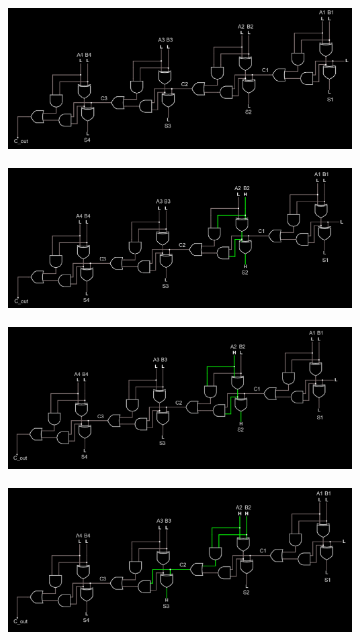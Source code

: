\documentclass{article}
\begin{document}
	\begin{figure}[H]
		\centering
		\begin{subfigure}[t]{0.8\textwidth}
			\centering
			\includegraphics[width=\textwidth]{4bit/4bit_000.png}
		\end{subfigure}
		
		\begin{subfigure}[b]{0.8\textwidth}
			\centering
			\includegraphics[width=\textwidth]{4bit/4bit_010.png}
		\end{subfigure}
		
		\begin{subfigure}[b]{0.8\textwidth}
			\centering
			\includegraphics[width=\textwidth]{4bit/4bit_100.png}
		\end{subfigure}
		
		\begin{subfigure}[b]{0.8\textwidth}
			\centering
			\includegraphics[width=\textwidth]{4bit/4bit_110.png}
		\end{subfigure}
	

\end{figure}
\end{document}
